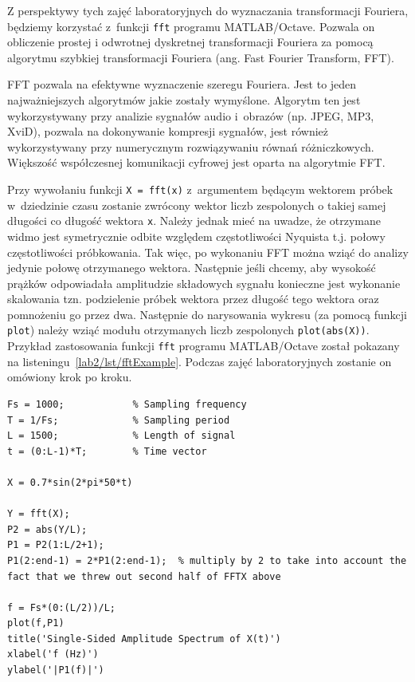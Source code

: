 Z perspektywy tych zajęć laboratoryjnych do wyznaczania transformacji Fouriera, będziemy korzystać z~funkcji \texttt{fft} programu MATLAB/Octave. Pozwala on obliczenie prostej i odwrotnej dyskretnej transformacji Fouriera za pomocą algorytmu szybkiej transformacji Fouriera (ang. Fast Fourier Transform, FFT).

FFT pozwala na efektywne wyznaczenie szeregu Fouriera. Jest to jeden najważniejszych algorytmów jakie zostały wymyślone. Algorytm ten jest wykorzystywany przy analizie sygnałów audio i~obrazów (np. JPEG, MP3, XviD), pozwala na dokonywanie kompresji sygnałów, jest również wykorzystywany przy numerycznym rozwiązywaniu równań różniczkowych. Większość współczesnej komunikacji cyfrowej jest oparta na algorytmie FFT. 

Przy wywołaniu funkcji \texttt{X = fft(x)} z~argumentem będącym wektorem próbek w~dziedzinie czasu zostanie zwrócony wektor liczb zespolonych o takiej samej długości co długość wektora \texttt{x}. Należy jednak mieć na uwadze, że otrzymane widmo jest symetrycznie odbite względem częstotliwości Nyquista t.j. połowy częstotliwości próbkowania. Tak więc, po wykonaniu FFT można wziąć do analizy jedynie połowę otrzymanego wektora. Następnie jeśli chcemy, aby wysokość prążków odpowiadała amplitudzie składowych sygnału konieczne jest wykonanie skalowania tzn. podzielenie próbek wektora przez długość tego wektora oraz pomnożeniu go przez dwa. Następnie do narysowania wykresu (za pomocą funkcji \texttt{plot}) należy wziąć modułu otrzymanych liczb zespolonych \texttt{plot(abs(X))}. Przykład zastosowania funkcji \texttt{fft} programu MATLAB/Octave został pokazany na listeningu~\ref{lab2/lst/fftExample}. Podczas zajęć laboratoryjnych zostanie on omówiony krok po kroku.

\begin{lstlisting}[caption=Przykład użycia funkcji \texttt{fft} programu MATLAB/Octave , label=lab2/lst/fftExample]
Fs = 1000;            % Sampling frequency                    
T = 1/Fs;             % Sampling period       
L = 1500;             % Length of signal
t = (0:L-1)*T;        % Time vector

X = 0.7*sin(2*pi*50*t)	
	
Y = fft(X);
P2 = abs(Y/L);
P1 = P2(1:L/2+1);
P1(2:end-1) = 2*P1(2:end-1);  % multiply by 2 to take into account the fact that we threw out second half of FFTX above

f = Fs*(0:(L/2))/L;
plot(f,P1) 
title('Single-Sided Amplitude Spectrum of X(t)')
xlabel('f (Hz)')
ylabel('|P1(f)|')
\end{lstlisting}



